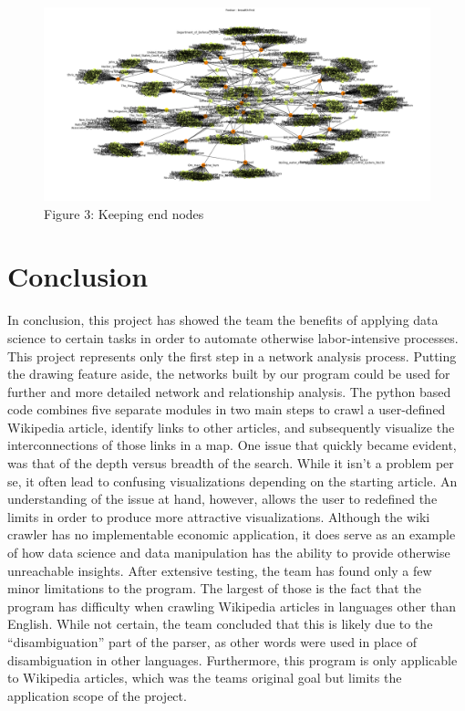 \documentclass[10pt]{article}
\begin{document}
	\begin{figure}[htb]	
			\includegraphics[width=\textwidth]{figure3.png}
   			  	\centering
  			  	\caption{Figure 3: Keeping end nodes}
		\end{figure}

	
	
\section{Conclusion}

In conclusion, this project has showed the team the benefits of applying data science to certain tasks in order to automate otherwise labor-intensive processes. This project represents only the first step in a network analysis process. Putting the drawing feature aside, the networks built by our program could be used for further and more detailed network and relationship analysis. The python based code combines five separate modules in two main steps to crawl a user-defined Wikipedia article, identify links to other articles, and subsequently visualize the interconnections of those links in a map. One issue that quickly became evident, was that of the depth versus breadth of the search. While it isn’t a problem per se, it often lead to confusing visualizations depending on the starting article. An understanding of the issue at hand, however, allows the user to redefined the limits in order to produce more attractive visualizations. Although the wiki crawler has no implementable economic application, it does serve as an example of how data science and data manipulation has the ability to provide otherwise unreachable insights. 
After extensive testing, the team has found only a few minor limitations to the program. The largest of those is the fact that the program has difficulty when crawling Wikipedia articles in languages other than English. While not certain, the team concluded that this is likely due to the “disambiguation” part of the parser, as other words were used in place of disambiguation in other languages. Furthermore, this program is only applicable to Wikipedia articles, which was the teams original goal but limits the application scope of the project. 



\newpage
 

\end{document}
